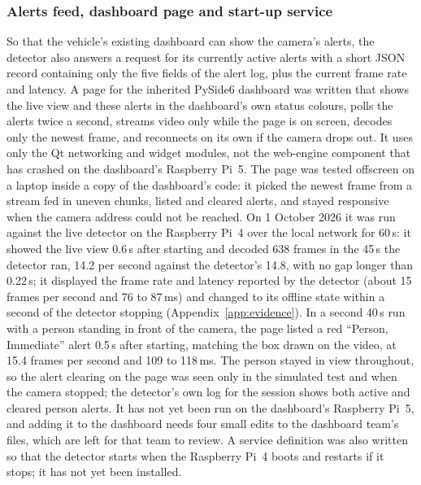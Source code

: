 \subsubsection*{Alerts feed, dashboard page and start-up service}
\label{sec:dashboard-page}

So that the vehicle's existing dashboard can show the camera's alerts, the detector also answers a request for its currently active alerts with a short JSON record containing only the five fields of the alert log, plus the current frame rate and latency. A page for the inherited PySide6 dashboard was written that shows the live view and these alerts in the dashboard's own status colours, polls the alerts twice a second, streams video only while the page is on screen, decodes only the newest frame, and reconnects on its own if the camera drops out. It uses only the Qt networking and widget modules, not the web-engine component that has crashed on the dashboard's Raspberry Pi~5. The page was tested offscreen on a laptop inside a copy of the dashboard's code: it picked the newest frame from a stream fed in uneven chunks, listed and cleared alerts, and stayed responsive when the camera address could not be reached. On 1 October 2026 it was run against the live detector on the Raspberry Pi~4 over the local network for 60\,s: it showed the live view 0.6\,s after starting and decoded 638 frames in the 45\,s the detector ran, 14.2 per second against the detector's 14.8, with no gap longer than 0.22\,s; it displayed the frame rate and latency reported by the detector (about 15 frames per second and 76 to 87\,ms) and changed to its offline state within a second of the detector stopping (Appendix~\ref{app:evidence}). In a second 40\,s run with a person standing in front of the camera, the page listed a red ``Person, Immediate'' alert 0.5\,s after starting, matching the box drawn on the video, at 15.4 frames per second and 109 to 118\,ms. The person stayed in view throughout, so the alert clearing on the page was seen only in the simulated test and when the camera stopped; the detector's own log for the session shows both active and cleared person alerts. It has not yet been run on the dashboard's Raspberry Pi~5, and adding it to the dashboard needs four small edits to the dashboard team's files, which are left for that team to review. A service definition was also written so that the detector starts when the Raspberry Pi~4 boots and restarts if it stops; it has not yet been installed.

